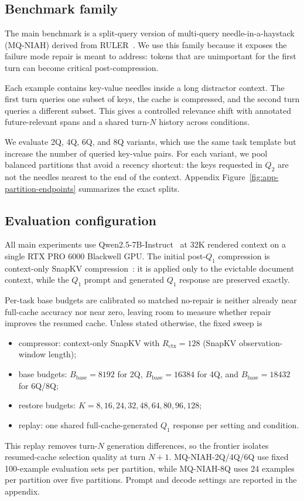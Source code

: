 \documentclass{article}
\newcommand{\bbase}{\ensuremath{B_{\mathrm{base}}}}
\begin{document}
\subsection{Benchmark family}
{The main benchmark is a split-query version of multi-query needle-in-a-haystack (MQ-NIAH) derived from RULER~\citep{ruler}. We use this family because it exposes the failure mode repair is meant to address: tokens that are unimportant for the first turn can become critical post-compression.

Each example contains key-value needles inside a long distractor context. The first turn queries one subset of keys, the cache is compressed, and the second turn queries a different subset. This gives a controlled relevance shift with annotated future-relevant spans and a shared turn-$N$ history across conditions.

We evaluate 2Q, 4Q, 6Q, and 8Q variants, which use the same task template but increase the number of queried key-value pairs. For each variant, we pool balanced partitions that avoid a recency shortcut: the keys requested in $Q_2$ are not the needles nearest to the end of the context. Appendix Figure~\ref{fig:app-partition-endpoints} summarizes the exact splits.}

\subsection{Evaluation configuration}
{All main experiments use Qwen2.5-7B-Instruct~\citep{qwen} at 32K rendered context on a single RTX PRO 6000 Blackwell GPU. The initial post-$Q_1$ compression is context-only SnapKV compression~\citep{snapkv}: it is applied only to the evictable document context, while the $Q_1$ prompt and generated $Q_1$ response are preserved exactly.}

Per-task base budgets are calibrated so matched no-repair is neither already near full-cache accuracy nor near zero, leaving room to measure whether repair improves the resumed cache. Unless stated otherwise, the fixed sweep is 
\begin{itemize}[leftmargin=1.4em,noitemsep,topsep=2pt]
    \item compressor: context-only SnapKV with
    $R_{\mathrm{ctx}}=128$ (SnapKV observation-window length);
    \item base budgets: $\bbase=8192$ for 2Q, $\bbase=16384$
  for 4Q, and
    $\bbase=18432$ for 6Q/8Q;
    \item restore budgets: $K=8,16,24,32,48,64,80,96,128$;
    \item replay: one shared full-cache-generated $Q_1$
  response per setting and
    condition.
  \end{itemize}
{This replay removes turn-$N$ generation differences, so the frontier isolates resumed-cache selection quality at turn $N{+}1$. MQ-NIAH-2Q/4Q/6Q use fixed 100-example evaluation sets per partition, while MQ-NIAH-8Q uses 24 examples per partition over five partitions.} Prompt and decode settings are reported in the appendix.
\end{document}
